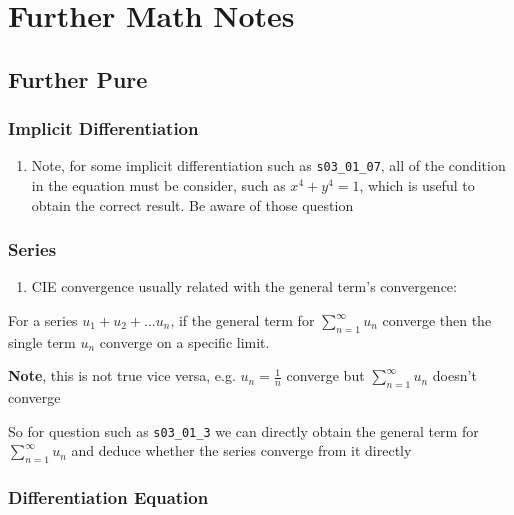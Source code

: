 \documentclass[]{article}
\date{}
\begin{document}
\section{Further Math Notes}\label{header-n106}

\subsection{Further Pure}\label{header-n108}

\subsubsection{Implicit Differentiation}\label{header-n109}

\begin{enumerate}
\def\labelenumi{\arabic{enumi}.}
\item
  Note, for some implicit differentiation such as \texttt{s03\_01\_07},
  all of the condition in the equation must be consider, such as
  \(x^4 + y^4 = 1\), which is useful to obtain the correct result. Be
  aware of those question
\end{enumerate}

\subsubsection{Series}\label{header-n113}

\begin{enumerate}
\def\labelenumi{\arabic{enumi}.}
\item
  CIE convergence usually related with the general term's convergence:
\end{enumerate}

For a series \(u_1 + u_2 + \dots u_n\), if the general term for
\(\sum_{n=1}^{\infty}{u_n}\) converge then the single term \(u_n\)
converge on a specific limit.

\textbf{Note}, this is not true vice versa, e.g. \(u_n = \frac{1}{n}\)
converge but \(\sum^\infty_{n=1}{u_n}\) doesn't converge

So for question such as \texttt{s03\_01\_3} we can directly obtain the
general term for \(\sum^\infty_{n=1}{u_n}\) and deduce whether the
series converge from it directly

\subsubsection{Differentiation Equation}\label{header-n120}
\end{document}
